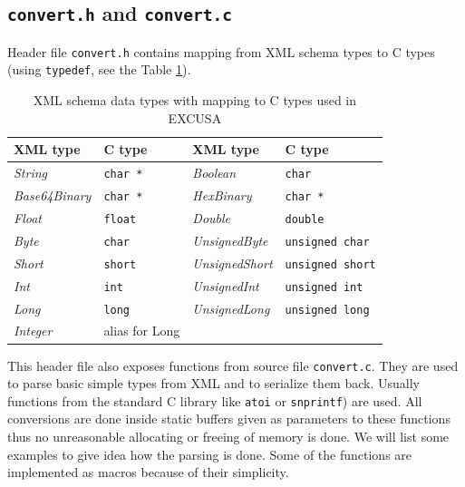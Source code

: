 \documentclass[12pt,notitlepage]{report}
\begin{document}
\subsection{\texttt{convert.h} and \texttt{convert.c}}
\label{convertheader}

Header file \texttt{convert.h} contains mapping from XML schema types to C types (using \texttt{typedef}, see the Table \ref{type-mapping}).

\begin{table}[htb]
\begin{center}
\renewcommand{\arraystretch}{1.3}
\begin{tabular}{|l|l|l|l|} \hline
\label{type-mapping}
\textbf{XML type} & \textbf{C type} & \textbf{XML type} & \textbf{C type} \\ \hline
\textit{String} & \texttt{char *} & \textit{Boolean} & \texttt{char} \\
\textit{Base64Binary} & \texttt{char *} & \textit{HexBinary} & \texttt{char *} \\
\textit{Float} & \texttt{float} & \textit{Double} & \texttt{double} \\
\textit{Byte} & \texttt{char} & \textit{UnsignedByte} & \texttt{unsigned char} \\
\textit{Short} & \texttt{short} & \textit{UnsignedShort} & \texttt{unsigned short} \\
\textit{Int} & \texttt{int} & \textit{UnsignedInt} & \texttt{unsigned int} \\
\textit{Long} & \texttt{long} & \textit{UnsignedLong} & \texttt{unsigned long} \\
\textit{Integer} & alias for Long & & \\
\hline
\end{tabular}
\end{center}
\caption{XML schema data types with mapping to C types used in EXCUSA}
\end{table}

This header file also exposes functions from source file \texttt{convert.c}. They are used to parse basic simple types from XML and to serialize them back. Usually functions from the standard C library like \texttt{atoi} or \texttt{snprintf}) are used. All conversions are done inside static buffers given as parameters to these functions thus no unreasonable allocating or freeing of memory is done. We will list some examples to give idea how the parsing is done. Some of the functions are implemented as macros because of their simplicity.
\end{document}
